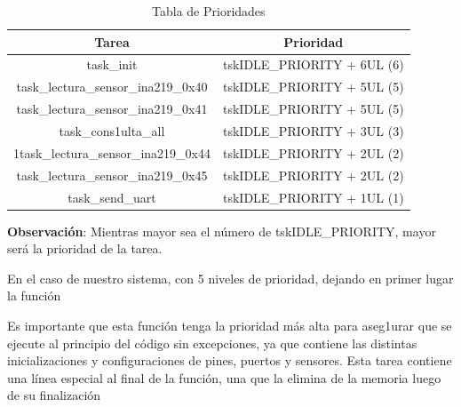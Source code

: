                         \begin{table}[H]
                            \centering
                            \begin{tabular}{|c|c|}
                            \hline
                                Tarea & Prioridad\\
                            \hline
                                task\_init & tskIDLE\_PRIORITY + 6UL (6) \\
                            \hline
                                task\_lectura\_sensor\_ina219\_0x40 & tskIDLE\_PRIORITY + 5UL (5)\\
                            \hline
                                task\_lectura\_sensor\_ina219\_0x41 & tskIDLE\_PRIORITY + 5UL (5)\\
                            \hline
                                task\_cons1ulta\_all & tskIDLE\_PRIORITY + 3UL (3) \\
                            \hline
                                1task\_lectura\_sensor\_ina219\_0x44 & tskIDLE\_PRIORITY + 2UL (2)\\
                            \hline
                                task\_lectura\_sensor\_ina219\_0x45 & tskIDLE\_PRIORITY + 2UL (2)\\
                            \hline
                                task\_send\_uart & tskIDLE\_PRIORITY + 1UL (1)\\
                            \hline
                            \end{tabular}
                            \caption{Tabla de Prioridades}
                            \label{tab:6}
                        \end{table}
                        
                    \textbf{Observación}: Mientras mayor sea el número de tskIDLE\_PRIORITY, mayor será la prioridad de la tarea.\par
                    En el caso de nuestro sistema, con 5 niveles de prioridad, dejando en primer lugar la función\par
                    
                    \par
                    
                    Es importante que esta función tenga la prioridad más alta para aseg1urar que se ejecute al principio del código sin excepciones, ya que contiene las distintas inicializaciones y configuraciones de pines, puertos y sensores. Esta tarea contiene una línea especial al final de la función, una que la elimina de la memoria luego de su finalización\par
                    
